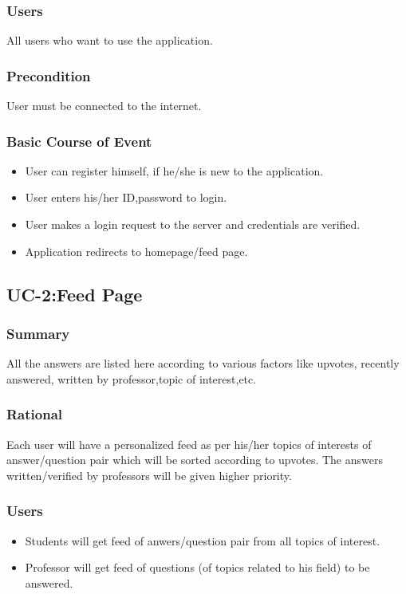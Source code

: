 \documentclass[journal,12pt,onecolumn,draftclsnofoot,]{IEEEtran}
\begin{document}
\subsubsection{Users}
All users who want to use the application.
\subsubsection{Precondition}
User must be connected to the internet.
\subsubsection{Basic Course of Event}
\begin{itemize}
\item User can register himself, if he/she is new to the application.
\item User enters his/her ID,password to login.
\item User makes a login request to the server and credentials are verified.
\item Application redirects to homepage/feed page.
\end{itemize}

\subsection{UC-2:Feed Page}
\subsubsection{Summary}
All the answers are listed here according to various factors like upvotes, recently answered, written by professor,topic of interest,etc.
\subsubsection{Rational}
Each user will have a personalized feed as per his/her topics of interests of answer/question pair which will be sorted according to upvotes. The answers written/verified by professors will be given higher priority.
\subsubsection{Users}
\begin{itemize}
\item Students will get feed of anwers/question pair from all topics of interest.
\item Professor will get feed of questions (of topics related to his field) to be answered.
\end{itemize}
\end{document}
